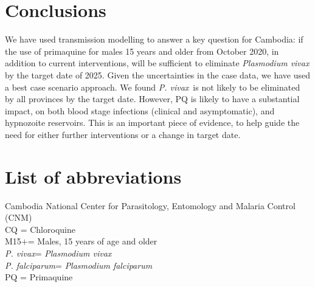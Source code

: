 \documentclass[doublespacing]{bmcart}
\newcommand{\pv}{\textit{P. vivax}}
\newcommand{\pf}{\textit{P. falciparum}}
\newcommand{\males}{M15$+$}
\begin{document}
\section*{Conclusions}

We have used transmission modelling to answer a key question for Cambodia: if the use of primaquine for males 15 years and older from October 2020, in addition to current interventions, will be sufficient to eliminate \textit{Plasmodium vivax} by the target date of 2025. Given the uncertainties in the case data, we have used a best case scenario approach. We found \pv~is not likely to be eliminated by all provinces by the target date. However, PQ is likely to have a substantial impact, on both blood stage infections (clinical and asymptomatic), and hypnozoite reservoirs. This is an important piece of evidence, to help guide the need for either further interventions or a change in target date. 

\section*{List of abbreviations}
Cambodia National Center for Parasitology, Entomology and Malaria Control (CNM)\\
CQ = Chloroquine \\
\males = Males, 15 years of age and older \\ 
\pv = \textit{Plasmodium vivax} \\
\pf = \textit{Plasmodium falciparum} \\
PQ = Primaquine \\


\end{document}
